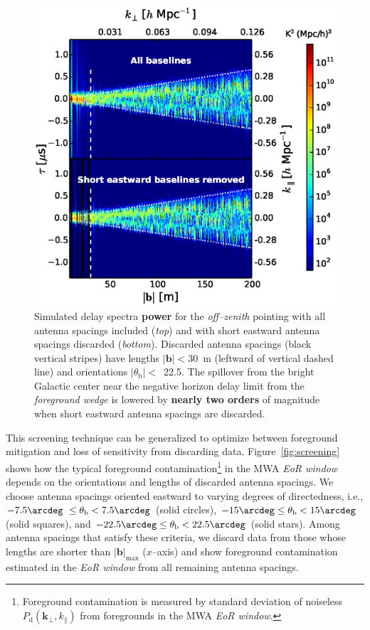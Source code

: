 \documentclass[preprint2,iop,numberedappendix]{emulateapj}
\begin{document}
\begin{figure}[htb]
\centering
\includegraphics[width=\linewidth]{fig13.eps}
\caption{Simulated delay spectra {\bf power} for the {\it off--zenith} pointing with all antenna spacings included ({\it top}) and with short eastward antenna spacings discarded ({\it bottom}). Discarded antenna spacings (black vertical stripes) have lengths $|\boldsymbol{b}|<30$~m (leftward of vertical dashed line) and orientations $|\theta_\textrm{b}|<$~22.5\arcdeg. The spillover from the bright Galactic center near the negative horizon delay limit from the {\it foreground wedge} is lowered by {\bf nearly two orders} of magnitude when short eastward antenna spacings are discarded. \label{fig:before-after}}
\end{figure}

This screening technique can be generalized to optimize between foreground mitigation and loss of sensitivity from discarding data. Figure~\ref{fig:screening} shows how the typical foreground contamination\footnote{Foreground contamination is measured by standard deviation of noiseless $P_\textrm{d}(\boldsymbol{k}_\perp,k_\parallel)$ from foregrounds in the MWA {\it EoR window}.} in the MWA {\it EoR window} depends on the orientations and lengths of discarded antenna spacings. We choose antenna spacings oriented eastward to varying degrees of directedness, i.e., $-7.5\arcdeg~\le\theta_\textrm{b} < 7.5\arcdeg$ (solid circles), $-15\arcdeg\le\theta_\textrm{b}< 15\arcdeg$ (solid squares), and $-22.5\arcdeg\le\theta_\textrm{b}< 22.5\arcdeg$ (solid stars). Among antenna spacings that satisfy these criteria, we discard data from those whose lengths are shorter than $|\boldsymbol{b}|_\textrm{max}$ ($x$--axis) and show foreground contamination estimated in the {\it EoR window} from all remaining antenna spacings. 
\end{document}
